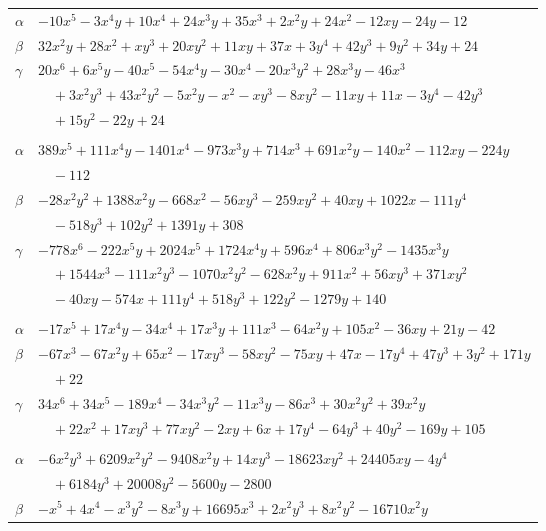 \documentclass[11pt]{article}
\begin{document}
\begin{longtable}{@{}ll@{}}
$\alpha$ & $-10x^{5}-3x^{4}y+10x^{4}+24x^{3}y+35x^{3}+2x^{2}y+24x^{2}-12xy-24y-12$\\
$\beta$ & $32x^{2}y+28x^{2}+xy^{3}+20xy^{2}+11xy+37x+3y^{4}+42y^{3}+9y^{2}+34y+24$\\
$\gamma$ & $20x^{6}+6x^{5}y-40x^{5}-54x^{4}y-30x^{4}-20x^{3}y^{2}+28x^{3}y-46x^{3}$\\
 & $\quad +3x^{2}y^{3}+43x^{2}y^{2}-5x^{2}y-x^{2}-xy^{3}-8xy^{2}-11xy+11x-3y^{4}-42y^{3}$\\
 & $\quad +15y^{2}-22y+24$\\
\addlinespace[3pt]
\multicolumn{2}{@{}l}{$\{i,j\}=\{33,38\}$, $k_{ij}=2^{4}\cdot 7$}\\
$\alpha$ & $389x^{5}+111x^{4}y-1401x^{4}-973x^{3}y+714x^{3}+691x^{2}y-140x^{2}-112xy-224y$\\
 & $\quad -112$\\
$\beta$ & $-28x^{2}y^{2}+1388x^{2}y-668x^{2}-56xy^{3}-259xy^{2}+40xy+1022x-111y^{4}$\\
 & $\quad -518y^{3}+102y^{2}+1391y+308$\\
$\gamma$ & $-778x^{6}-222x^{5}y+2024x^{5}+1724x^{4}y+596x^{4}+806x^{3}y^{2}-1435x^{3}y$\\
 & $\quad +1544x^{3}-111x^{2}y^{3}-1070x^{2}y^{2}-628x^{2}y+911x^{2}+56xy^{3}+371xy^{2}$\\
 & $\quad -40xy-574x+111y^{4}+518y^{3}+122y^{2}-1279y+140$\\
\addlinespace[3pt]
\multicolumn{2}{@{}l}{$\{i,j\}=\{33,39\}$, $k_{ij}=2\cdot 3\cdot 7$}\\
$\alpha$ & $-17x^{5}+17x^{4}y-34x^{4}+17x^{3}y+111x^{3}-64x^{2}y+105x^{2}-36xy+21y-42$\\
$\beta$ & $-67x^{3}-67x^{2}y+65x^{2}-17xy^{3}-58xy^{2}-75xy+47x-17y^{4}+47y^{3}+3y^{2}+171y$\\
 & $\quad +22$\\
$\gamma$ & $34x^{6}+34x^{5}-189x^{4}-34x^{3}y^{2}-11x^{3}y-86x^{3}+30x^{2}y^{2}+39x^{2}y$\\
 & $\quad +22x^{2}+17xy^{3}+77xy^{2}-2xy+6x+17y^{4}-64y^{3}+40y^{2}-169y+105$\\
\addlinespace[3pt]
\multicolumn{2}{@{}l}{$\{i,j\}=\{33,41\}$, $k_{ij}=2^{4}\cdot 5^{2}\cdot 7$}\\
$\alpha$ & $-6x^{2}y^{3}+6209x^{2}y^{2}-9408x^{2}y+14xy^{3}-18623xy^{2}+24405xy-4y^{4}$\\
 & $\quad +6184y^{3}+20008y^{2}-5600y-2800$\\
$\beta$ & $-x^{5}+4x^{4}-x^{3}y^{2}-8x^{3}y+16695x^{3}+2x^{2}y^{3}+8x^{2}y^{2}-16710x^{2}y$\\

\end{longtable}
\end{document}
